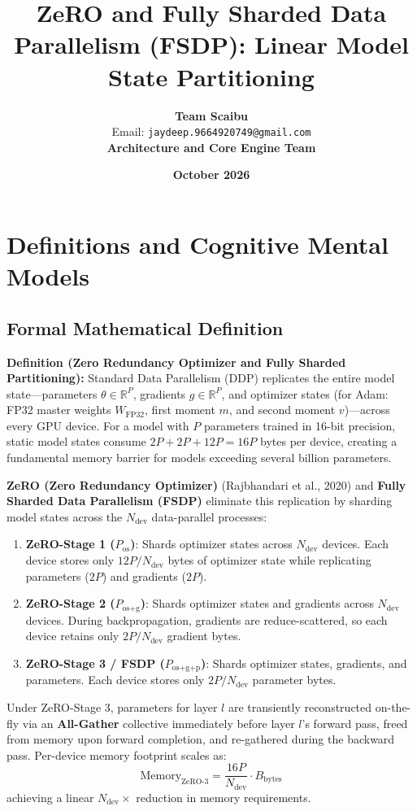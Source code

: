 \documentclass[11pt,a4paper]{article}
\title{\textbf{ZeRO and Fully Sharded Data Parallelism (FSDP): Linear Model State Partitioning}}
\author{\textbf{Team Scaibu} \\ \small Email: \texttt{jaydeep.9664920749@gmail.com} \\ \small \textbf{Architecture and Core Engine Team}}
\date{\textbf{October 2026}}
\theoremstyle{definition}
\begin{document}
\maketitle

\section{Definitions and Cognitive Mental Models}

\subsection{Formal Mathematical Definition}
\textbf{Definition (Zero Redundancy Optimizer and Fully Sharded Partitioning):}
Standard Data Parallelism (DDP) replicates the entire model state—parameters $\theta \in \mathbb{R}^P$, gradients $g \in \mathbb{R}^P$, and optimizer states (for Adam: FP32 master weights $W_{\text{FP32}}$, first moment $m$, and second moment $v$)—across every GPU device. For a model with $P$ parameters trained in 16-bit precision, static model states consume $2P + 2P + 12P = 16P$ bytes per device, creating a fundamental memory barrier for models exceeding several billion parameters.

\textbf{ZeRO (Zero Redundancy Optimizer)} (Rajbhandari et al., 2020) and \textbf{Fully Sharded Data Parallelism (FSDP)} eliminate this replication by sharding model states across the $N_{\text{dev}}$ data-parallel processes:
\begin{enumerate}
    \item \textbf{ZeRO-Stage 1 ($P_{\text{os}}$)}: Shards optimizer states across $N_{\text{dev}}$ devices. Each device stores only $12P / N_{\text{dev}}$ bytes of optimizer state while replicating parameters ($2P$) and gradients ($2P$).
    \item \textbf{ZeRO-Stage 2 ($P_{\text{os+g}}$)}: Shards optimizer states and gradients across $N_{\text{dev}}$ devices. During backpropagation, gradients are reduce-scattered, so each device retains only $2P / N_{\text{dev}}$ gradient bytes.
    \item \textbf{ZeRO-Stage 3 / FSDP ($P_{\text{os+g+p}}$)}: Shards optimizer states, gradients, and parameters. Each device stores only $2P / N_{\text{dev}}$ parameter bytes.
\end{enumerate}
Under ZeRO-Stage 3, parameters for layer $l$ are transiently reconstructed on-the-fly via an \textbf{All-Gather} collective immediately before layer $l$'s forward pass, freed from memory upon forward completion, and re-gathered during the backward pass. Per-device memory footprint scales as:
{\boldmath
\begin{equation}
\text{Memory}_{\text{ZeRO-3}} = \frac{16 P}{N_{\text{dev}}} \cdot B_{\text{bytes}}
\end{equation}
}
achieving a linear $N_{\text{dev}}\times$ reduction in memory requirements.
\end{document}
